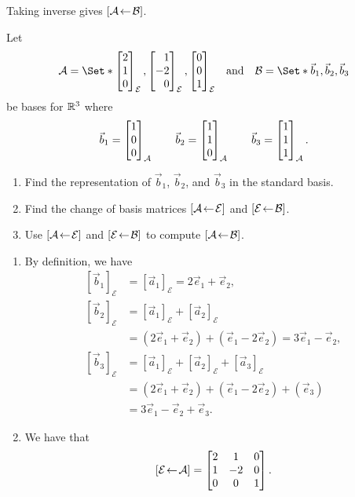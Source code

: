 \begin{exercises}
\begin{problist}
\begin{solution}
\begin{enumerate}
				Taking inverse gives $\BasisChange{\mathcal B}{\mathcal A}$.
			\end{enumerate}
		\end{solution}
		\prob 
		Let
		\[
			\mathcal A=\Set*{
				\mat{2\\1\\0}_{\mathcal E},
				\mat{1\\-2\\0}_{\mathcal E},
				\mat{0\\0\\1}_{\mathcal E}
			}\quad\text{and}\quad
			\mathcal B=\Set*{\vec b_1,\vec b_2,\vec b_3
			}
		\]
		be bases for $\R^3$ where
		\[
			\vec b_1=\mat{1\\0\\0}_{\mathcal A}
			\qquad
			\vec b_2=\mat{1\\1\\0}_{\mathcal A}
			\qquad
			\vec b_3=\mat{1\\1\\1}_{\mathcal A}.
		\]
		\begin{enumerate}
			\item Find the representation of $\vec b_1$, $\vec b_2$, and $\vec b_3$
				in the standard basis.
			\item Find the change of basis matrices $\BasisChange{\mathcal E}{\mathcal A}$
				and $\BasisChange{\mathcal B}{\mathcal E}$.
			\item Use $\BasisChange{\mathcal E}{\mathcal A}$
				and $\BasisChange{\mathcal B}{\mathcal E}$ to compute
				$\BasisChange{\mathcal B}{\mathcal A}$.
		\end{enumerate}
		\begin{solution}
			\begin{enumerate}
				\item By definition, we have
				\[
					\begin{aligned}
						[\vec b_1]_{\mathcal E}&=[\vec a_1]_{\mathcal E}=2\vec e_1+\vec e_2,\\
						[\vec b_2]_{\mathcal E}&=[\vec a_1]_{\mathcal E}+[\vec a_2]_{\mathcal E}\\
						&=(2\vec e_1+\vec e_2)+(\vec e_1-2\vec e_2)=3\vec e_1-\vec e_2,\\
						[\vec b_3]_{\mathcal E}&=[\vec a_1]_{\mathcal E}+[\vec a_2]_{\mathcal E}+[\vec a_3]_{\mathcal E}\\
						&=(2\vec e_1+\vec e_2)+(\vec e_1-2\vec e_2)+(\vec e_3)\\
						&=3\vec e_1-\vec e_2+\vec e_3.
					\end{aligned}
				\]
				\item We have that
				\[
					\BasisChange{\mathcal A}{\mathcal E}=
					\begin{bmatrix}
						2 & 1 & 0\\
						1 & -2 & 0\\
						0 & 0 & 1
					\end{bmatrix}.
				\]
				

\end{enumerate}
\end{solution}
\end{problist}
\end{exercises}

